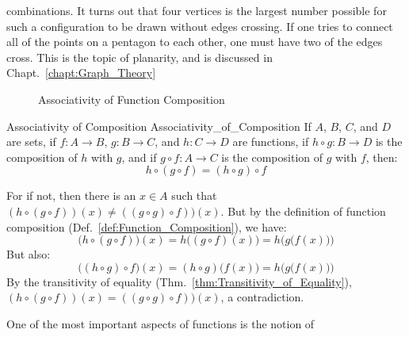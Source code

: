         combinations. It turns out that four vertices is the largest number
        possible for such a configuration to be drawn without edges crossing.
        If one tries to connect all of the points on a pentagon to each other,
        one must have two of the edges cross. This is the topic of planarity,
        and is discussed in Chapt.~\ref{chapt:Graph_Theory}
        \begin{figure}[H]
            \centering
            \captionsetup{type=figure}
            
            \caption{Associativity of Function Composition}
            \label{fig:Associativity_of_Function_Comp}
        \end{figure}
        \begin{ftheorem}{Associativity of Composition}
                        {Associativity_of_Composition}
            If $A$, $B$, $C$, and $D$ are sets, if $f:A\rightarrow{B}$,
            $g:B\rightarrow{C}$, and $h:C\rightarrow{D}$ are functions, if
            $h\circ{g}:B\rightarrow{D}$ is the composition of $h$ with $g$, and
            if $g\circ{f}:A\rightarrow{C}$ is the composition of $g$ with $f$,
            then:
            \begin{equation*}
                h\circ(g\circ{f})=(h\circ{g})\circ{f}
            \end{equation*}
        \end{ftheorem}
        \begin{bproof}
            For if not, then there is an $x\in{A}$ such that
            $(h\circ(g\circ{f}))(x)\ne((g\circ{g})\circ{f}))(x)$. But by the
            definition of function composition
            (Def.~\ref{def:Function_Composition}), we have:
            \begin{equation}
                \big(h\circ(g\circ{f})\big)(x)
                =h\big((g\circ{f})(x)\big)
                =h\Big(g\big(f(x)\big)\Big)
            \end{equation}
            But also:
            \begin{equation}
                \big((h\circ{g})\circ{f}\big)(x)
                =(h\circ{g})\big(f(x)\big)
                =h\Big(g\big(f(x)\big)\Big)
            \end{equation}
            By the transitivity of equality 
            (Thm.~\ref{thm:Transitivity_of_Equality}),
            $(h\circ(g\circ{f}))(x)=((g\circ{g})\circ{f}))(x)$, a contradiction.
        \end{bproof}
        One of the most important aspects of functions is the notion of
